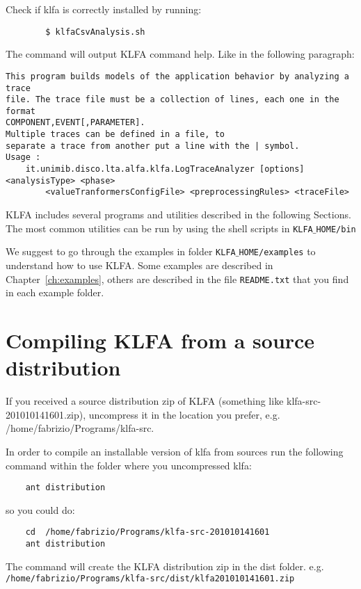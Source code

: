 		Check if klfa is correctly installed by running:
		\begin{verbatim}
		$ klfaCsvAnalysis.sh 
		\end{verbatim}
		
		The command will output KLFA command help. Like in the following paragraph:
		\begin{verbatim}
This program builds models of the application behavior by analyzing a trace
file. The trace file must be a collection of lines, each one in the format
COMPONENT,EVENT[,PARAMETER]. 
Multiple traces can be defined in a file, to
separate a trace from another put a line with the | symbol. 
Usage : 
	it.unimib.disco.lta.alfa.klfa.LogTraceAnalyzer [options] <analysisType> <phase>
		<valueTranformersConfigFile> <preprocessingRules> <traceFile>
	\end{verbatim}
	
	
KLFA includes several programs and utilities described in the following
Sections. The most common utilities can be run by using the shell scripts in
\texttt{KLFA$\_$HOME/bin}
	
We suggest to go through the examples in folder \texttt{KLFA$\_$HOME/examples}
to understand how to use KLFA. Some examples are described in
Chapter~\ref{ch:examples}, others are described in the file \texttt{README.txt}
that you find in each example folder.



\section{Compiling KLFA from a source distribution}
\label{sec:compileKLFA}

If you received a source distribution zip of KLFA (something like 
klfa-src-201010141601.zip), uncompress it in the location you prefer, 
e.g. /home/fabrizio/Programs/klfa-src.


In order to compile an installable version of klfa from sources run the following
command within the folder where you uncompressed klfa:
\begin{verbatim}
	ant distribution
\end{verbatim}	
	
so you could do:
\begin{verbatim}
	cd 	/home/fabrizio/Programs/klfa-src-201010141601
	ant distribution
\end{verbatim}	
	
The command will create the KLFA distribution zip in the dist folder.
e.g.
\texttt{/home/fabrizio/Programs\-/klfa-src/dist/klfa\-201010141601.zip}


